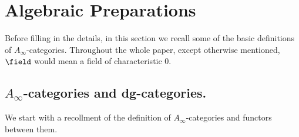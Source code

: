 \section{Algebraic Preparations\label{sec:algebraic-preparations}}
Before filling in the details, in this section we recall some of the basic definitions of $A_{\infty}$-categories. Throughout the whole paper, except otherwise mentioned, $\field$ would mean a field of characteristic $0$.
\subsection{$A_{\infty}$-categories and dg-categories.} We start with a recollment of the definition of $A_{\infty}$-categories and functors between them.
